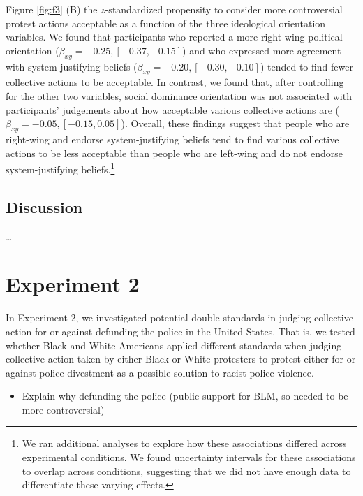 \documentclass[twocolumn, 11pt, letterpaper]{article}
\providecommand{\tightlist}{\setlength{\itemsep}{0pt}\setlength{\parskip}{0pt}}
\begin{document}
Figure \ref{fig:f3} (B) the \(z\)-standardized propensity to consider
more controversial protest actions acceptable as a function of the three
ideological orientation variables. We found that participants who
reported a more right-wing political orientation
(\(\beta_{xy} = -0.25, [-0.37, -0.15]\)) and who expressed more
agreement with system-justifying beliefs
(\(\beta_{xy} = -0.20, [-0.30, -0.10]\)) tended to find fewer collective
actions to be acceptable. In contrast, we found that, after controlling
for the other two variables, social dominance orientation was not
associated with participants' judgements about how acceptable various
collective actions are (\(\beta_{xy} = -0.05, [-0.15, 0.05]\)). Overall,
these findings suggest that people who are right-wing and endorse
system-justifying beliefs tend to find various collective actions to be
less acceptable than people who are left-wing and do not endorse
system-justifying beliefs.\footnote{We ran additional analyses to
  explore how these associations differed across experimental
  conditions. We found uncertainty intervals for these associations to
  overlap across conditions, suggesting that we did not have enough data
  to differentiate these varying effects.}

\hypertarget{discussion}{%
\subsection{Discussion}\label{discussion}}

\ldots

\hypertarget{experiment-2}{%
\section{Experiment 2}\label{experiment-2}}

In Experiment 2, we investigated potential double standards in judging
collective action for or against defunding the police in the United
States. That is, we tested whether Black and White Americans applied
different standards when judging collective action taken by either Black
or White protesters to protest either for or against police divestment
as a possible solution to racist police violence.

\begin{itemize}
\tightlist
\item
  Explain why defunding the police (public support for BLM, so needed to
  be more controversial)
\end{itemize}
\end{document}
